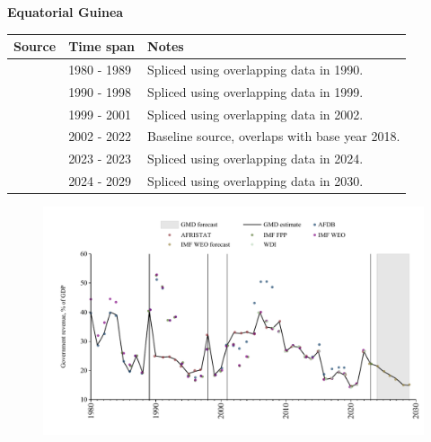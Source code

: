 \documentclass[12pt,a4paper,landscape]{article}
\begin{document}
\begin{adjustbox}{max totalsize={\paperwidth}{\paperheight},center}
\begin{minipage}[t][\textheight][t]{\textwidth}
\vspace*{0.5cm}
{}
\begin{center}
{\Large\bfseries Equatorial Guinea}
\end{center}
\vspace{0.5cm}
\begin{table}[H]
\centering
\small
\begin{tabular}{|l|l|l|}
\hline
\textbf{Source} & \textbf{Time span} & \textbf{Notes} \\
\hline
\rowcolor{white}\cite{AFDB}& 1980 - 1989 &Spliced using overlapping data in 1990.\\
\rowcolor{lightgray}\cite{AFRISTAT}& 1990 - 1998 &Spliced using overlapping data in 1999.\\
\rowcolor{white}\cite{AFDB}& 1999 - 2001 &Spliced using overlapping data in 2002.\\
\rowcolor{lightgray}\cite{AFRISTAT}& 2002 - 2022 &Baseline source, overlaps with base year 2018.\\
\rowcolor{white}\cite{IMF_FPP}& 2023 - 2023 &Spliced using overlapping data in 2024.\\
\rowcolor{lightgray}\cite{IMF_WEO_forecast}& 2024 - 2029 &Spliced using overlapping data in 2030.\\
\hline
\end{tabular}
\end{table}
\begin{figure}[H]
\centering
\includegraphics[width=\textwidth,height=0.6\textheight,keepaspectratio]{graphs/GNQ_govrev_GDP.pdf}
\end{figure}
\end{minipage}
\end{adjustbox}
\end{document}
